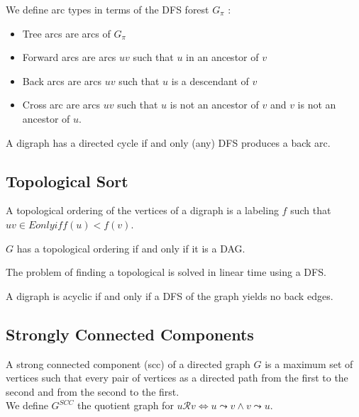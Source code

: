 \documentclass{cours}
\begin{document}
\begin{definition}
    We define arc types in terms of the DFS forest $G_{\pi}$ :
    \begin{itemize}
        \item Tree arcs are arcs of $G_{\pi}$
        \item Forward arcs are arcs $uv$ such that $u$ in an ancestor of $v$
        \item Back arcs are arcs $uv$ such that $u$ is a descendant of $v$
        \item Cross arc are arcs $uv$ such that $u$ is not an ancestor of $v$ and $v$ is not an ancestor of $u$.
    \end{itemize}
\end{definition}

\begin{proposition}
    A digraph has a directed cycle if and only (any) DFS produces a back arc.
\end{proposition}

\subsection{Topological Sort}
\begin{definition}
    A topological ordering of the vertices of a digraph is a labeling $f$ such that $uv \in E only if f(u) < f(v)$.
\end{definition}

\begin{theorem}
    $G$ has a topological ordering if and only if it is a DAG.
\end{theorem}

\begin{theorem}
    The problem of finding a topological is solved in linear time using a DFS.
\end{theorem}

\begin{lemma}
    A digraph is acyclic if and only if a DFS of the graph yields no back edges.
\end{lemma}

\subsection{Strongly Connected Components}
\begin{definition}
    A strong connected component (scc) of a directed graph $G$ is a maximum set of vertices such that every pair of vertices as a directed path from the first to the second and from the second to the first. \\ We define $G^{SCC}$ the quotient graph for $u \mathcal{R} v \Leftrightarrow u \leadsto v \wedge v \leadsto u$.
\end{definition}
\end{document}

